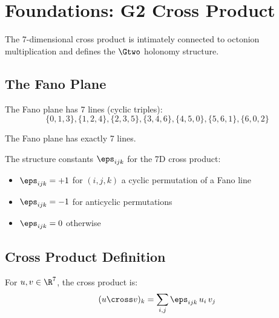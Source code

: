 \chapter{Foundations: G2 Cross Product}\label{chap:g2}

The 7-dimensional cross product is intimately connected to octonion multiplication
and defines the $\Gtwo$ holonomy structure.

\section{The Fano Plane}

\begin{definition}\label{def:fano_lines}
    \leanok
    The Fano plane has 7 lines (cyclic triples):
    \[
        \{0,1,3\}, \{1,2,4\}, \{2,3,5\}, \{3,4,6\}, \{4,5,0\}, \{5,6,1\}, \{6,0,2\}
    \]
\end{definition}

\begin{theorem}\label{thm:fano_lines_count}
    \leanok
    The Fano plane has exactly 7 lines.
\end{theorem}

\begin{definition}\label{def:epsilon}
    \leanok
    The structure constants $\eps_{ijk}$ for the 7D cross product:
    \begin{itemize}
        \item $\eps_{ijk} = +1$ for $(i,j,k)$ a cyclic permutation of a Fano line
        \item $\eps_{ijk} = -1$ for anticyclic permutations
        \item $\eps_{ijk} = 0$ otherwise
    \end{itemize}
\end{definition}

\section{Cross Product Definition}

\begin{definition}\label{def:cross}
    \leanok
    For $u, v \in \R^7$, the cross product is:
    \[
        (u \cross v)_k = \sum_{i,j} \eps_{ijk} \, u_i \, v_j
    \]
\end{definition}

